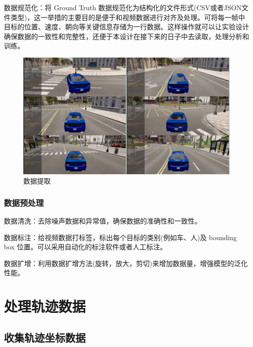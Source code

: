 数据规范化：将 Ground Truth 数据规范化为结构化的文件形式(CSV或者JSON文件类型)，这一举措的主要目的是便于和视频数据进行对齐及处理。可将每一帧中目标的位置、速度、朝向等关键信息存储为一行数据。这样操作就可以让实验设计确保数据的一致性和完整性，还便于本设计在接下来的日子中去读取，处理分析和训练。



\begin{figure}[htbp] %
	\centering
	\includegraphics[width=1\textwidth]{p35} %
	\caption{数据提取} %
	\label{fig:p35} %
\end{figure}



\subsubsection{数据预处理}

数据清洗：去除噪声数据和异常值，确保数据的准确性和一致性。

数据标注：给视频数据打标签，标出每个目标的类别(例如车、人)及 bounding box 位置。可以采用自动化的标注软件或者人工标注。

数据扩增：利用数据扩增方法(旋转，放大，剪切)来增加数据量，增强模型的泛化性能。








\section{处理轨迹数据}

\subsection{收集轨迹坐标数据}

